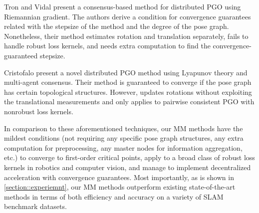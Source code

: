 Tron and Vidal \cite{tron2014distributed} present a consensus-based method for distributed PGO using Riemannian gradient. The authors derive a condition for convergence guarantees related with the stepsize of the method and the degree of the pose graph. Nonetheless, their method estimates rotation and translation separately, fails to handle robust loss kernels, and needs extra computation to find the convergence-guaranteed stepsize. 

Cristofalo \ea \cite{eric2020geod} present a novel distributed PGO method using  Lyapunov theory and multi-agent consensus. Their method is guaranteed to converge if the pose graph has certain topological structures. However, \cite{eric2020geod} updates rotations without exploiting the translational measurements and only applies to pairwise consistent PGO with nonrobust loss kernels.



In comparison to these aforementioned techniques, our MM methods have the mildest conditions (not requiring any specific pose graph structures, any extra computation for preprocessing, any master nodes for information aggregation, etc.) to converge to first-order critical points, apply to a broad class of robust loss kernels in robotics and computer vision, and manage to implement decentralized acceleration with convergence guarantees. Most importantly, as is shown in \cref{section::experiemnt}, our MM methods outperform existing state-of-the-art methods in terms of both efficiency and accuracy on a variety of SLAM benchmark datasets.